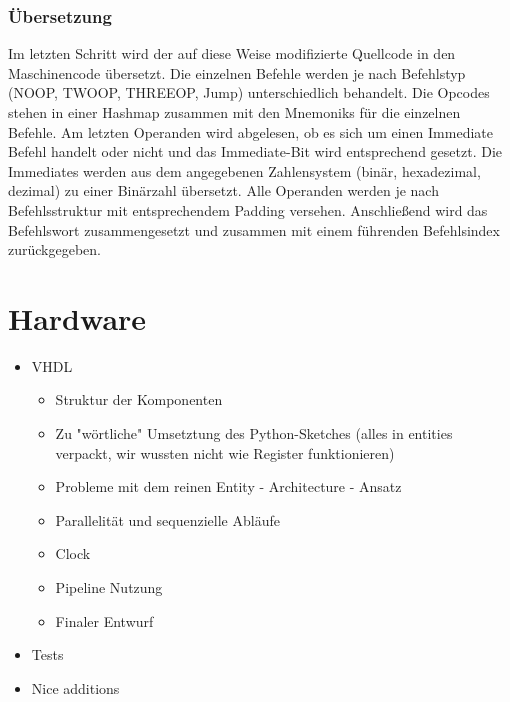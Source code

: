 \documentclass[paper=a4,fontsize=12pt]{scrreprt}
\begin{document}
\subsection{Übersetzung}
Im letzten Schritt wird der auf diese Weise modifizierte Quellcode in den Maschinencode übersetzt. Die einzelnen Befehle werden je nach Befehlstyp (NOOP, TWOOP, THREEOP, Jump) unterschiedlich behandelt. Die Opcodes stehen in einer Hashmap zusammen mit den Mnemoniks für die einzelnen Befehle. Am letzten Operanden wird abgelesen, ob es sich um einen Immediate Befehl handelt oder nicht und das Immediate-Bit wird entsprechend gesetzt. Die Immediates werden aus dem angegebenen Zahlensystem (binär, hexadezimal, dezimal) zu einer Binärzahl übersetzt. Alle Operanden werden je nach Befehlsstruktur mit entsprechendem Padding versehen. Anschließend wird das Befehlswort zusammengesetzt und zusammen mit einem führenden Befehlsindex zurückgegeben.


\chapter{Hardware}

\begin{itemize}
    \item VHDL
    \begin{itemize}
        \item Struktur der Komponenten
        \item Zu "wörtliche" Umsetztung des Python-Sketches (alles in entities verpackt, wir wussten nicht wie Register funktionieren)
        \item Probleme mit dem reinen Entity - Architecture - Ansatz
        \item Parallelität und sequenzielle Abläufe
        \item Clock
        \item Pipeline Nutzung
        \item Finaler Entwurf
    \end{itemize}
    \item Tests
    \item Nice additions
\end{itemize}
\end{document}
